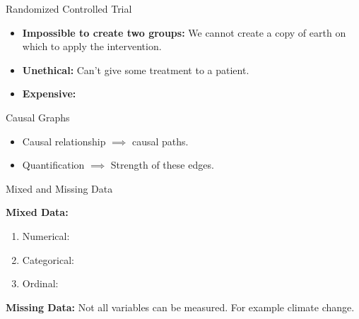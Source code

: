 \documentclass[aspectratio=169]{beamer}
\begin{document}
\begin{frame}{Randomized Controlled Trial}
	
	\vspace{2em}

	\begin{itemize}[<+->]
		\item \textbf{Impossible to create two groups: } We cannot create a copy of earth on which to apply the intervention.
		\item \textbf{Unethical: } Can't give some treatment to a patient.
		\item \textbf{Expensive: }
	\end{itemize}

	\vspace{2em}

\end{frame}

\begin{frame}{Causal Graphs}


	\begin{itemize}
		\item Causal relationship $ \implies $ causal paths.
		\item Quantification $ \implies $ Strength of these edges.
	\end{itemize}
\end{frame}

\begin{frame}{Mixed and Missing Data}

	\textbf{Mixed Data:}
		\begin{enumerate}
			\item Numerical:
			\item Categorical:
			\item Ordinal:
		\end{enumerate}

	\textbf{Missing Data:} Not all variables can be measured. For example climate change.
\end{frame}
\end{document}
